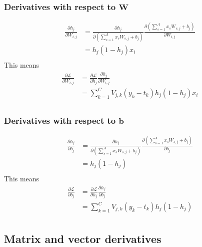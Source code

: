 \documentclass{article}
\begin{document}
\subsubsection*{Derivatives with respect to $\mathbf{W}$}
\begin{equation}
\begin{split}
    \frac{\partial h_j}{\partial W_{i,j}}
    &= \frac{\partial h_j}{\partial(\sum_{s=1}^A x_s W_{s,j} + b_j)}
       \frac{\partial(\sum_{s=1}^A x_s W_{s,j} + b_j)}{\partial W_{i,j}} \\
    &= h_j (1 - h_j) x_i \\
\end{split}
\end{equation}
This means
\begin{equation}
\begin{split}
    \frac{\partial \mathcal{L}}{\partial W_{i,j}}
    &= \frac{\partial \mathcal{L}}{\partial h_j}
       \frac{\partial h_j}{\partial W_{i,j}} \\
    &= \sum_{k=1}^C V_{j,k}(y_k - t_k) h_j (1 - h_j) x_i \\
\end{split}
\end{equation}

\subsubsection*{Derivatives with respect to $\mathbf{b}$}
\begin{equation}
\begin{split}
    \frac{\partial h_j}{\partial b_j}
    &= \frac{\partial h_j}{\partial(\sum_{s=1}^A x_s W_{s,j} + b_j)}
       \frac{\partial(\sum_{s=1}^A x_s W_{s,j} + b_j)}{\partial b_j} \\
    &= h_j (1 - h_j) \\
\end{split}
\end{equation}
This means
\begin{equation}
\begin{split}
    \frac{\partial \mathcal{L}}{\partial b_j}
    &= \frac{\partial \mathcal{L}}{\partial h_j}
       \frac{\partial h_j}{\partial b_j} \\
    &= \sum_{k=1}^C V_{j,k}(y_k - t_k) h_j (1 - h_j) \\
\end{split}
\end{equation}

\subsection*{Matrix and vector derivatives}
\end{document}

